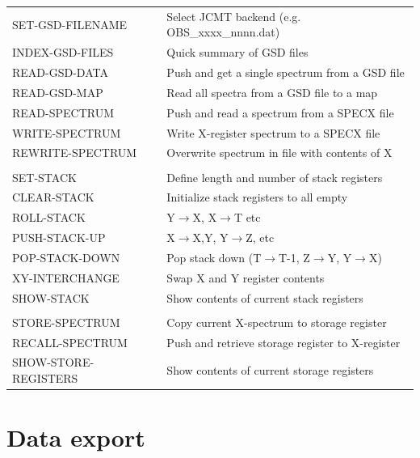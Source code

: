 \documentclass[11pt,twoside]{report}
\begin{document}
\begin{tabular}{ll}
SET-GSD-FILENAME       & Select JCMT backend (e.g. OBS\_xxxx\_nnnn.dat)\\
INDEX-GSD-FILES        & Quick summary of GSD files \\
READ-GSD-DATA          & Push and get a single spectrum from a GSD file\\
READ-GSD-MAP           & Read all spectra from a GSD file to a map\\
READ-SPECTRUM          & Push and read a spectrum from a SPECX file \\
WRITE-SPECTRUM         & Write X-register spectrum to a SPECX file\\
REWRITE-SPECTRUM       & Overwrite spectrum in file with contents of X\\
\\
SET-STACK              & Define length and number of stack registers\\
CLEAR-STACK            & Initialize stack registers to all empty\\
ROLL-STACK             & Y$\rightarrow$X, X$\rightarrow$T etc\\
PUSH-STACK-UP          & X$\rightarrow$X,Y, Y$\rightarrow$Z, etc\\
POP-STACK-DOWN         & \parbox[t]{4.5in}{
                         Pop stack down (T$\rightarrow$T-1, Z$\rightarrow$Y,
                         Y$\rightarrow$X)}\\
XY-INTERCHANGE         & Swap X and Y register contents\\
SHOW-STACK             & Show contents of current stack registers\\
\\
STORE-SPECTRUM         & Copy current X-spectrum to storage register\\
RECALL-SPECTRUM        & Push and retrieve storage register to X-register\\
SHOW-STORE-REGISTERS   & Show contents of current storage registers\\
\end{tabular}

\section{Data export}
\end{document}
